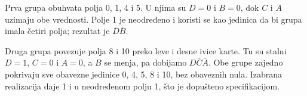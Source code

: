 
Prva grupa obuhvata polja 0, 1, 4 i 5. U njima su \(D=0\) i \(B=0\), dok \(C\) i \(A\) uzimaju obe vrednosti. Polje 1 je neodređeno i koristi se kao jedinica da bi grupa imala četiri polja; rezultat je \(\bar D\bar B\).

Druga grupa povezuje polja 8 i 10 preko leve i desne ivice karte. Tu su stalni \(D=1\), \(C=0\) i \(A=0\), a \(B\) se menja, pa dobijamo \(D\bar C\bar A\). Obe grupe zajedno pokrivaju sve obavezne jedinice 0, 4, 5, 8 i 10, bez obaveznih nula. Izabrana realizacija daje 1 i u neodređenom polju 1, što je dopušteno specifikacijom.
